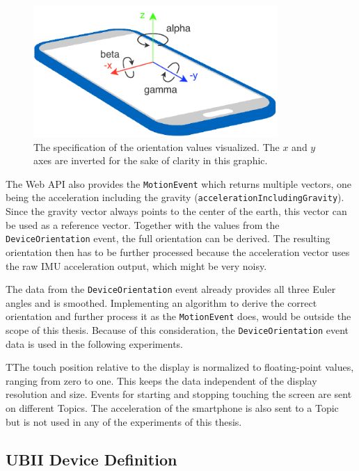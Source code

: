 \begin{figure}[htpb]
  \centering
  \includegraphics[height=5cm]{figures/implementation/webapi_device_orientation.pdf}
  \caption[Device coordinate system and orientation values]{The specification of the orientation values visualized. The \(x\) and \(y\) axes are inverted for the sake of clarity in this graphic.}\label{fig:webapi-device-orientation}
\end{figure}

The Web \ac{API} also provides the \lstinline{MotionEvent} which returns multiple vectors, one being the acceleration including the gravity (\lstinline{accelerationIncludingGravity}). Since the gravity vector always points to the center of the earth, this vector can be used as a reference vector. Together with the values from the \lstinline{DeviceOrientation} event, the full orientation can be derived. The resulting orientation then has to be further processed because the acceleration vector uses the raw \ac{IMU} acceleration output, which might be very noisy.

The data from the \lstinline{DeviceOrientation} event already provides all three Euler angles and is smoothed. Implementing an algorithm to derive the correct orientation and further process it as the \lstinline{MotionEvent} does, would be outside the scope of this thesis. Because of this consideration, the \lstinline{DeviceOrientation} event data is used in the following experiments.

TThe touch position relative to the display is normalized to floating-point values,  ranging from zero to one. This keeps the data independent of the display resolution and size. Events for starting and stopping touching the screen are sent on different Topics. The acceleration of the smartphone is also sent to a Topic but is not used in any of the experiments of this thesis.


\subsection{UBII Device Definition}\label{subsection:ubii-device-definition}

